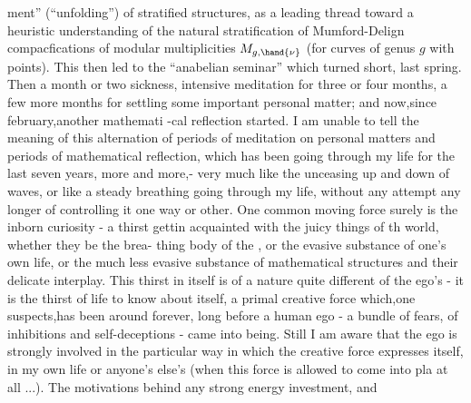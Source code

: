 
ment'' (``unfolding'') of stratified structures,  as a leading thread toward
a heuristic understanding of the natural stratification of  Mumford-Delign
compacfications of modular multiplicities $M_{g,\hand{\nu}}$ (for curves of genus $g$
 with \hand{$\nu$} points).  This then led to the ``anabelian seminar'' which
 turned short,  last spring.  Then a month or two sickness,  intensive
meditation  for three or four months,  a few more months for settling
some important personal matter;  and now,since february,another mathemati%
-cal reflection started. \hand{$\rfloor$}I  am unable to tell the meaning of this
alternation of periods of meditation on personal matters and periods of
mathematical reflection,  which has been going through my life for the
last seven years,  more and more,- very much like the unceasing
up and down of waves,  or like a steady breathing going through my life,
without any attempt any longer of controlling it one way or other.  One
common moving force surely is the inborn curiosity  -  a thirst  gettin
acquainted with the juicy things of th  world,  whether they be the brea-%
thing body of the ,  or the evasive substance of one's own life,
or the much less evasive substance of mathematical structures and their
delicate interplay.  This thirst in itself is of a nature quite different
of the ego's  -  it is the thirst of life to know about itself,  a primal
creative force which,one suspects,has been around forever,  long before
a human ego  -  a bundle  of fears,  of inhibitions and self-deceptions -
came into being.  Still I am aware that the ego is strongly involved in
the particular way in which the creative force expresses itself,  in my
own life or anyone's else's (when this force is allowed to come into pla
at all ...).  The motivations behind any strong energy investment,  and
